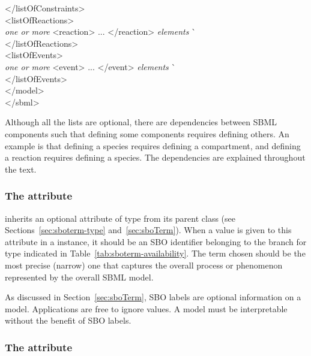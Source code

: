 \begin{tt}
\begin{tabbing}
\>\></listOfConstraints>\\
\>\><listOfReactions>\\
\>\>\>\textrm{\emph{one or more}} <reaction> ... </reaction> \textrm{\emph{elements}}  \` \sayOptional\\
\>\></listOfReactions>\\
\>\><listOfEvents>\\
\>\>\>\textrm{\emph{one or more}} <event> ... </event> \textrm{\emph{elements}}  \` \sayOptional\\
\>\></listOfEvents>\\
\></model>\\
</sbml>
\end{tabbing}
\regularspacing
\end{tt}
\vspace*{1ex}

Although all the lists are optional, there are dependencies
between SBML components such that defining some components
requires defining others.  An example is that defining a species
requires defining a compartment, and defining a reaction requires
defining a species.  The dependencies are explained throughout the
text.
  

\subsubsection{The  attribute}
\label{sec:model-sboterm}

\Model inherits an optional 
attribute of type  from its parent
class \SBase (see Sections~\ref{sec:sboterm-type}
and~\ref{sec:sboTerm}).  When a value is given to this
attribute in a \Model instance, it should be an
SBO identifier belonging to the branch for type \Model 
indicated in Table~\ref{tab:sboterm-availability}. 
The term chosen should be the most precise (narrow)
one that captures the overall process or phenomenon represented
by the overall SBML model.

As discussed in Section~\ref{sec:sboTerm}, SBO labels are optional
information on a model.  Applications are free to ignore
 values.  A model must be interpretable without the
benefit of SBO labels.

\subsubsection{The  attribute}
\label{sec:model-substanceUnits}

